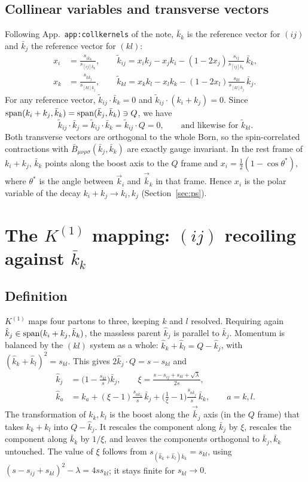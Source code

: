 \documentclass[11pt,a4paper]{article}
\newcommand{\jb}{\bar k_{j}}
\newcommand{\kb}{\bar k_{k}}
\newcommand{\jh}{\hat k_{j}}
\newcommand{\kh}{\hat k_{k}}
\newcommand{\lh}{\hat k_{l}}
\newcommand{\sqL}{\sqrt{\lambda}}
\begin{document}
\subsection{Collinear variables and transverse vectors}
Following App.~\texttt{app:collkernels} of the note, $\kb$ is the reference vector for $(ij)$ and
$\jb$ the reference vector for $(kl)$:
\begin{align}
x_i&=\frac{s_{i\kb}}{s_{[ij]\kb}},\qquad
\tilde k_{ij}=x_i k_j-x_jk_i-(1-2x_j)\frac{s_{ij}}{s_{[ij]\kb}}\,\kb,\\
x_k&=\frac{s_{k\jb}}{s_{[kl]\jb}},\qquad
\tilde k_{kl}=x_k k_l-x_lk_k-(1-2x_l)\frac{s_{kl}}{s_{[kl]\jb}}\,\jb .
\end{align}
For any reference vector, $\tilde k_{ij}\cdot\kb=0$ and $\tilde k_{ij}\cdot(k_i+k_j)=0$.
Since ${\rm span}(k_i+k_j,\kb)={\rm span}(\jb,\kb)\ni Q$, we have
\begin{equation}
\tilde k_{ij}\cdot\jb=\tilde k_{ij}\cdot\kb=\tilde k_{ij}\cdot Q=0,
\qquad\text{and likewise for }\tilde k_{kl}.
\end{equation}
Both transverse vectors are orthogonal to the whole Born, so the spin-correlated contractions
with $\bar B_{\mu\nu\rho\sigma}(\jb,\kb)$ are exactly gauge invariant.
In the rest frame of $k_i+k_j$, $\kb$ points along the boost axis to the $Q$ frame and
$x_i=\tfrac12(1-\cos\theta^*)$, where $\theta^*$ is the angle between $\vec k_i$ and $\vec{\bar k}_k$ in that frame.
Hence $x_i$ is the polar variable of the decay $k_i+k_j\to k_i,k_j$ (Section~\ref{sec:ps}).

\section{The $K^{(1)}$ mapping: $(ij)$ recoiling against $\kb$}
\label{sec:M1}

\subsection{Definition}
$K^{(1)}$ maps four partons to three, keeping $k$ and $l$ resolved. Requiring again
$\jh\in{\rm span}(k_i+k_j,\kb)$, the massless parent $\jh$ is parallel to $\jb$. Momentum is
balanced by the $(kl)$ system as a whole: $\kh+\lh=Q-\jh$, with
$(\kh+\lh)^2=s_{kl}$. This gives $2\jh\cdot Q=s-s_{kl}$ and
\begin{equation}
\boxed{\;\begin{aligned}
\jh&=\Big(1-\frac{s_{kl}}{s}\Big)\jb,\qquad
\xi=\frac{s-s_{ij}+s_{kl}+\sqL}{2s},\\
\hat k_a&=k_a+(\xi-1)\frac{s_{a\kb}}{s}\,\jb+\Big(\frac1\xi-1\Big)\frac{s_{a\jb}}{s}\,\kb,
\qquad a=k,l.
\end{aligned}\;}
\label{eq:M1}
\end{equation}
The transformation of $k_k,k_l$ is the boost along the $\vec{\bar k}_j$ axis (in the $Q$ frame)
that takes $k_k+k_l$ into $Q-\jh$. It rescales the component along $\jb$ by $\xi$, rescales
the component along $\kb$ by $1/\xi$, and leaves the components orthogonal to $\jb,\kb$ untouched.
The value of $\xi$ follows from $s_{(\kh+\lh)\kb}=s_{kl}$, using
$(s-s_{ij}+s_{kl})^2-\lambda=4ss_{kl}$; it stays finite for $s_{kl}\to0$.
\end{document}
